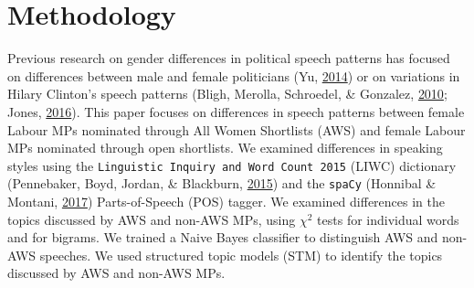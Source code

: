\documentclass[]{article}
\theoremstyle{definition}
\theoremstyle{definition}
\theoremstyle{definition}
\theoremstyle{remark}
\begin{document}
\begin{table}[H]
\begin{table}[H]
\hypertarget{methodology}{%
\section{Methodology}\label{methodology}}

Previous research on gender differences in political speech patterns has
focused on differences between male and female politicians (Yu,
\protect\hyperlink{ref-yu2014}{2014}) or on variations in Hilary
Clinton's speech patterns (Bligh, Merolla, Schroedel, \& Gonzalez,
\protect\hyperlink{ref-bligh2010}{2010}; Jones,
\protect\hyperlink{ref-jones2016}{2016}). This paper focuses on
differences in speech patterns between female Labour MPs nominated
through All Women Shortlists (AWS) and female Labour MPs nominated
through open shortlists. We examined differences in speaking styles
using the \texttt{Linguistic\ Inquiry\ and\ Word\ Count\ 2015} (LIWC)
dictionary (Pennebaker, Boyd, Jordan, \& Blackburn,
\protect\hyperlink{ref-pennebaker2015}{2015}) and the \texttt{spaCy}
(Honnibal \& Montani, \protect\hyperlink{ref-honnibal2017}{2017})
Parts-of-Speech (POS) tagger. We examined differences in the topics
discussed by AWS and non-AWS MPs, using \({\chi}^2\) tests for
individual words and for bigrams. We trained a Naive Bayes classifier to
distinguish AWS and non-AWS speeches. We used structured topic models
(STM) to identify the topics discussed by AWS and non-AWS MPs.


\end{table}
\end{table}
\end{document}
